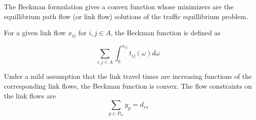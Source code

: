 The Beckman formulation gives a convex function whose minimizers
are the equillibrium path flow (or link flow) solutions
of the traffic equillibrium problem.

For a given link flow $x_{ij}$ for $i,j\in A$, the Beckman function
is defined as

\begin{equation}\label{beck}
	\sum_{i,j\in A}\int_{0}^{x_{ij}}t_{ij}(\omega)d\omega
\end{equation}

Under a mild assumption that the link travel times 
are increasing functions of the corresponding link flows,
the Beckman function is convex. %
The flow constraints on the link flows are
\[
	\sum_{p\in P_{rs}}y_p = d_{rs}
\]
